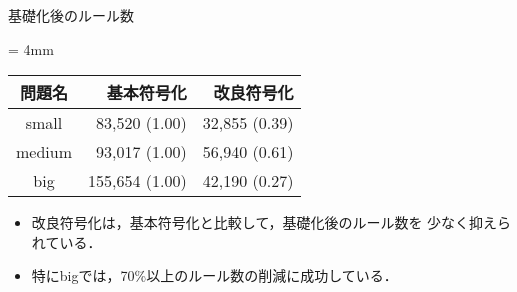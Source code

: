 \documentclass[dvipdfmx, 11pt]{beamer}
\begin{document}
\begin{frame}{基礎化後のルール数}
 \begin{exampleblock}{}\centering 
  \renewcommand{\arraystretch}{1.2}
  \tabcolsep = 4mm
  \begin{tabular}{crr} 
   問題名    & 基本符号化       & 改良符号化    \\ \hline
   small    &  83,520 (1.00)  & 32,855 (0.39) \\ 
   medium   &  93,017 (1.00)  & 56,940 (0.61) \\
   big	    & 155,654 (1.00)  & 42,190 (0.27) \\ 
  \end{tabular}
 \end{exampleblock}
 \begin{itemize}
  \item 改良符号化は，基本符号化と比較して，基礎化後のルール数を
	少なく抑えられている．
  \item 特にbigでは，70\%以上のルール数の削減に成功している．
 \end{itemize}
\end{frame}
\end{document}
